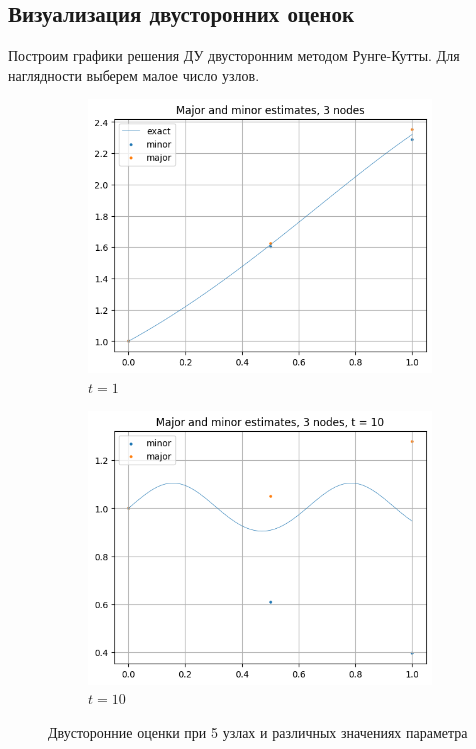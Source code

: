 \subsection{Визуализация двусторонних оценок}
Построим графики решения ДУ двусторонним методом Рунге-Кутты. Для наглядности выберем малое число узлов.
\begin{figure}[H]
	\centering
	\begin{subfigure}{0.45\textwidth}
		\centering
		\includegraphics[width=\linewidth]{img/visualization/TwoSided3nodest1}
		\caption{$t = 1$}
	\end{subfigure}
	\hfill
	\begin{subfigure}{0.45\textwidth}
		\centering
		\includegraphics[width=\linewidth]{img/visualization/TwoSided3nodest2}
		\caption{$t = 10$}
	\end{subfigure}
	\caption{Двусторонние оценки при 5 узлах и различных значениях параметра}
	\label{fig:two_graphs}
\end{figure}

